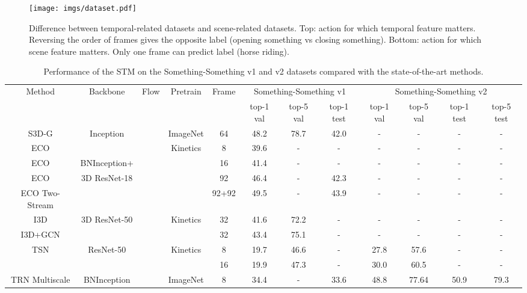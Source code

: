 \documentclass[10pt,twocolumn,letterpaper]{article}
\begin{document}
	
\begin{figure}[tbp]
		\begin{center}
			\texttt{[image: imgs/dataset.pdf]}
		\end{center}
		\caption{Difference between temporal-related datasets and scene-related datasets. Top: action for which temporal feature matters. Reversing the order of frames gives the opposite label (opening something vs closing something). Bottom: action for which scene feature matters. Only one frame can predict label (horse riding).}
		\label{dataset}
	\end{figure}
\begin{table*}[htbp]
		\centering
		\caption{Performance of the STM on the Something-Something v1 and v2 datasets compared with the state-of-the-art methods.}
		\label{some}
		\begin{adjustbox}{max width=\textwidth}
			\begin{threeparttable}
				\begin{tabular}{c|c|c|c|c|c|c|c|c|c|c|c}
					\hline
					\multirow{2}{*}{Method} & \multirow{2}{*}{Backbone}  & \multirow{2}{*}{Flow} & \multirow{2}{*}{Pretrain} & \multirow{2}{*}{Frame} & \multicolumn{3}{c|}{Something-Something v1} & \multicolumn{4}{c}{Something-Something v2}\tabularnewline
					\cline{6-12}
					
					& &  &  &  & top-1 val & top-5 val & top-1 test & top-1 val & top-5 val & top-1 test & top-5 test\tabularnewline
					\hline
					\hline
					S3D-G \cite{xie2018rethinking} & Inception & & ImageNet & 64 & 48.2 & 78.7 & 42.0 & - & - & - & -\tabularnewline
					\hline
					ECO \cite{zolfaghari2018eco} & & & \multirow{4}{*}{Kinetics} & 8 & 39.6 & - & - & - & - & - & -\tabularnewline
					
					ECO \cite{zolfaghari2018eco} & BNInception+ & & & 16 & 41.4 & - & - & - & - & - & -\tabularnewline
					
					ECO \cite{zolfaghari2018eco} & 3D ResNet-18 & & & 92 & 46.4 & - & 42.3 & - & - & - & -\tabularnewline
					
					ECO Two-Stream \cite{zolfaghari2018eco} &  &  \checkmark & & 92+92 & 49.5 & - & 43.9 & - & - & - & -\tabularnewline
					\hline
					I3D \cite{carreira2017quo} & \multirow{2}{*}{3D ResNet-50}  & & \multirow{2}{*}{Kinetics} & 32 & 41.6 & 72.2 & - & - & - & - & -\tabularnewline
					I3D+GCN \cite{carreira2017quo} & & &   & 32 & 43.4 & 75.1 & - & - & - & - & -\tabularnewline
					\hline
					\hline
					\multirow{2}{*}{TSN \cite{wang2016temporal}} & \multirow{2}{*}{ResNet-50} &\multirow{2}{*}{} & \multirow{2}{*}{Kinetics} & 8 & 19.7 & 46.6 & - & 27.8 & 57.6 & - & -\tabularnewline
					& & & & 16 & 19.9 & 47.3 & - & 30.0 & 60.5 & - & -\tabularnewline
					\hline
					TRN Multiscale \cite{zhou2018temporal} & \multirow{2}{*}{BNInception} &  & \multirow{2}{*}{ImageNet} & 8 & 34.4 & - & 33.6 & 48.8 & 77.64 & 50.9 & 79.3\tabularnewline
					

\end{tabular}
\end{threeparttable}
\end{adjustbox}
\end{table*}
\end{document}
